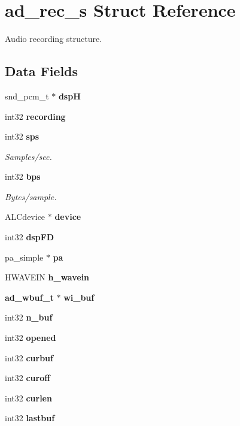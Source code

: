 \section{ad\+\_\+rec\+\_\+s Struct Reference}
\label{structad__rec__s}


Audio recording structure.  


\subsection*{Data Fields}
\begin{DoxyCompactItemize}
\item 
\mbox{\label{structad__rec__s_af4b2cd7de40e5b2a48d2d6878d33cc18}} 
snd\+\_\+pcm\+\_\+t $\ast$ {\bfseries dspH}
\item 
\mbox{\label{structad__rec__s_a5ddf90deb3806752a1fa3152fe864047}} 
int32 {\bfseries recording}
\item 
\mbox{\label{structad__rec__s_a2c5120af44acf19c5c7c63778bc932a3}} 
int32 \textbf{ sps}
\begin{DoxyCompactList}\small\item\em Samples/sec. \end{DoxyCompactList}\item 
\mbox{\label{structad__rec__s_a731523ef22607a580877bdcc563d9e5e}} 
int32 \textbf{ bps}
\begin{DoxyCompactList}\small\item\em Bytes/sample. \end{DoxyCompactList}\item 
\mbox{\label{structad__rec__s_a3e4378783effb06051461aca5a3d2f6c}} 
A\+L\+Cdevice $\ast$ {\bfseries device}
\item 
\mbox{\label{structad__rec__s_a7bd3eea2ed7b7be7155d4304505b140e}} 
int32 {\bfseries dsp\+FD}
\item 
\mbox{\label{structad__rec__s_a8ebda5d453f68928e21548739f27ceb9}} 
pa\+\_\+simple $\ast$ {\bfseries pa}
\item 
\mbox{\label{structad__rec__s_a79081fc333f54eff7afdc23404f3ae69}} 
H\+W\+A\+V\+E\+IN {\bfseries h\+\_\+wavein}
\item 
\mbox{\label{structad__rec__s_a81d0d2d45fe558b7e7c5504680b15dc5}} 
\textbf{ ad\+\_\+wbuf\+\_\+t} $\ast$ {\bfseries wi\+\_\+buf}
\item 
\mbox{\label{structad__rec__s_acd8fe38386d84c3e954f2652577c0c7e}} 
int32 {\bfseries n\+\_\+buf}
\item 
\mbox{\label{structad__rec__s_a8f1c8d2056486373a7d87c89e995b8f2}} 
int32 {\bfseries opened}
\item 
\mbox{\label{structad__rec__s_a1eb7456dc028152343c8d538195a8aa3}} 
int32 {\bfseries curbuf}
\item 
\mbox{\label{structad__rec__s_a1c7d3d94fc97bb318cbfe4aa33088b62}} 
int32 {\bfseries curoff}
\item 
\mbox{\label{structad__rec__s_ab9d6eff8b29d0741ed3b4133a57174ca}} 
int32 {\bfseries curlen}
\item 
\mbox{\label{structad__rec__s_a30b13811b7b97765861b776e29d5d34c}} 
int32 {\bfseries lastbuf}
\end{DoxyCompactItemize}


